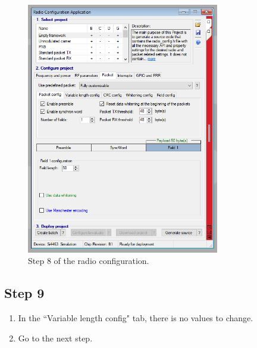 \documentclass[12pt]{book}
\begin{document}
\begin{appendices}
\begin{figure}[!h]
	\begin{center}
		\includegraphics[width=0.75\textwidth]{figures/wds-tutorial-8.png}
		\caption{Step 8 of the radio configuration.}
		\label{fig:wds-tutorial-step-8}
	\end{center}
\end{figure}

\subsection{Step 9}

\begin{enumerate}
    \item In the ``Variable length config" tab, there is no values to change.
    \item Go to the next step.
\end{enumerate}


\end{appendices}
\end{document}
